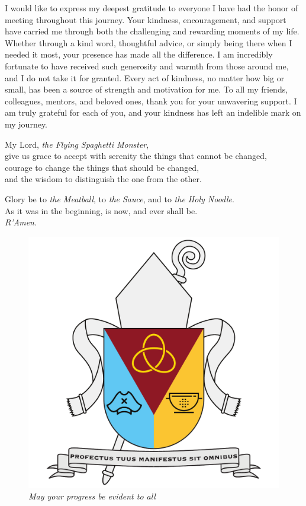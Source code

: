 \documentclass[11pt, a4paper, onecolumn, oneside]{report}
\begin{document}
        I would like to express my deepest gratitude to everyone I have had the honor of meeting throughout this journey. Your kindness, encouragement, and support have carried me through both the challenging and rewarding moments of my life. Whether through a kind word, thoughtful advice, or simply being there when I needed it most, your presence has made all the difference. I am incredibly fortunate to have received such generosity and warmth from those around me, and I do not take it for granted. Every act of kindness, no matter how big or small, has been a source of strength and motivation for me. To all my friends, colleagues, mentors, and beloved ones, thank you for your unwavering support. I am truly grateful for each of you, and your kindness has left an indelible mark on my journey.

        \begin{center}
            My Lord, \textit{the Flying Spaghetti Monster},\\
            give us grace to accept with serenity the things that cannot be changed,\\
            courage to change the things that should be changed,\\
            and the wisdom to distinguish the one from the other.

            \medspace

            Glory be to \textit{the Meatball}, to \textit{the Sauce}, and to \textit{the Holy Noodle}. \\
            As it was in the beginning, is now, and ever shall be. \\
            \textit{R'Amen.}
        \end{center}

        \begin{figure}[hp]
            \centering
            \includegraphics[width=10 cm]{Figures/Coat of arms.pdf}
            \caption*{\textit{May your progress be evident to all}}
        \end{figure}
    \clearpage

\hbox{ }
\thispagestyle{empty}
\clearpage
\end{document}
